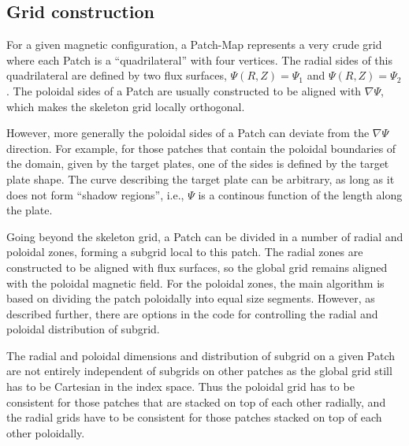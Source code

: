 \subsection{Grid construction}

For a given magnetic configuration, a Patch-Map represents a very
crude grid where each Patch is a ``quadrilateral'' with four vertices.
The radial sides of this quadrilateral are defined by two flux
surfaces, $\Psi(R,Z)=\Psi_1$ and $\Psi(R,Z)=\Psi_2$. The poloidal
sides of a Patch are usually constructed to be aligned with $\nabla
\Psi$, which makes the skeleton grid locally orthogonal. 

However, more generally the poloidal sides of a Patch can deviate from
the $\nabla \Psi$ direction. For example, for those patches that
contain the poloidal boundaries of the domain, given by the target
plates, one of the sides is defined by the target plate shape. The
curve describing the target plate can be arbitrary, as long as it does
not form ``shadow regions'', i.e., $\Psi$ is a continous function of
the length along the plate.

Going beyond the skeleton grid, a Patch can be divided in a number of
radial and poloidal zones, forming a subgrid local to this patch. The
radial zones are constructed to be aligned with flux surfaces, so the
global grid remains aligned with the poloidal magnetic field. For the
poloidal zones, the main algorithm is based on dividing the patch
poloidally into equal size segments. However, as described further,
there are options in the code for controlling the radial and poloidal
distribution of subgrid.

The radial and poloidal dimensions and distribution of subgrid on a
given Patch are not entirely independent of subgrids on other patches
as the global grid still has to be Cartesian in the index space. Thus
the poloidal grid has to be consistent for those patches that are
stacked on top of each other radially, and the radial grids have to be
consistent for those patches stacked on top of each other poloidally.
